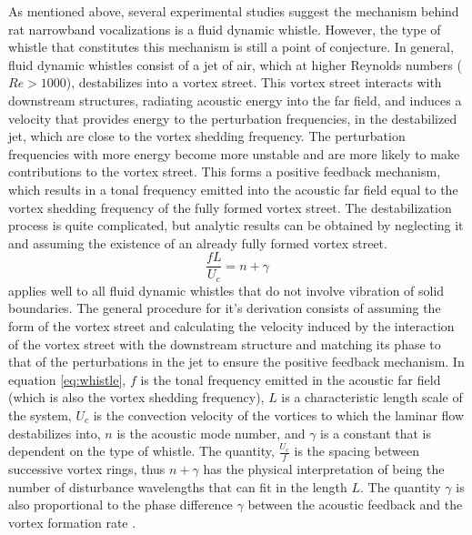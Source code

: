 \documentclass[twocolumn, prl]{revtex4}
\begin{document}
As mentioned above, several experimental studies suggest the mechanism behind rat narrowband vocalizations is a fluid dynamic whistle. However, the type of whistle that constitutes this mechanism is still a point of conjecture. In general, fluid dynamic whistles consist of a jet of air, which at higher Reynolds numbers ($Re>1000$), destabilizes into a vortex street. This vortex street interacts with downstream structures, radiating acoustic energy into the far field, and induces a velocity that provides energy to the perturbation frequencies, in the destabilized jet, which are close to the vortex shedding frequency. The perturbation frequencies with more energy become more unstable and are more likely to make contributions to the vortex street. This forms a positive feedback mechanism, which results in a tonal frequency emitted into the acoustic far field equal to the vortex shedding frequency of the fully formed vortex street. The destabilization process is quite complicated, but analytic results can be obtained by neglecting it and assuming the existence of an already fully formed vortex street.
\begin{equation}
\label{eq:whistle}
\frac{fL}{U_{c}}=n+\gamma
\end{equation}
applies well to all fluid dynamic whistles that do not involve vibration of solid boundaries. The general procedure for it's derivation consists of assuming the form of the vortex street and calculating the velocity induced by the interaction of the vortex street with the downstream structure and matching its phase to that of the perturbations in the jet to ensure the positive feedback mechanism. In equation \ref{eq:whistle}, $f$ is the tonal frequency emitted in the acoustic far field (which is also the vortex shedding frequency), $L$ is a characteristic length scale of the system, $U_c$ is the convection velocity of the vortices to which the laminar flow destabilizes into, $n$ is the acoustic mode number, and $\gamma$ is a constant that is dependent on the type of whistle. The quantity, $\frac{U_c}{f}$ is the spacing between successive vortex rings, thus $n+\gamma$ has the physical interpretation of being the number of disturbance wavelengths that can fit in the length $L$. The quantity $\gamma$ is also proportional to the phase difference $\gamma$ between the acoustic feedback and the vortex formation rate \cite{Howe2008,Blake1986}.
\end{document}
